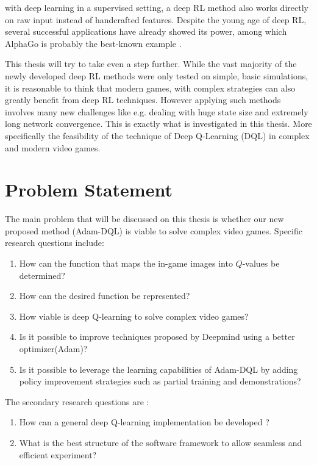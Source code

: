         with deep learning in a supervised setting, a deep RL method also works directly on raw input instead
        of handcrafted features. Despite the young age of deep RL, several successful applications have already
        showed its power\cite{mnih2015humanlevel}\cite{DBLP:journals/corr/LevineFDA15}, among which AlphaGo is probably the best-known example \cite{deepGO}.
        \par
        This thesis will try to take even a step  further. While the vast majority of the newly developed deep
        RL methods were only tested on simple, basic simulations, it is reasonable to think that modern games, with complex strategies can also greatly benefit from deep RL techniques. However applying such methods
        involves many new challenges like e.g. dealing with huge state size and extremely long network convergence. This is exactly what is investigated
        in this thesis. More specifically the feasibility of the technique of Deep Q-Learning (DQL) \cite{mnih2015humanlevel} in complex and modern video games.

	\section{Problem Statement}
	    The main problem that will be discussed on this thesis is whether our new proposed method (Adam-DQL) is viable to solve complex video games. Specific research questions include:
        \begin{enumerate}
            \item How can the function that maps the in-game images into $Q$-values be determined?
            \item How can the desired function be represented?
            \item How viable is deep Q-learning to solve complex video games?
            \item Is it possible to improve techniques proposed by Deepmind using a better optimizer(Adam)?
            \item Is it possible to leverage the learning capabilities of Adam-DQL by adding policy improvement strategies such as partial training and demonstrations? 
    \end{enumerate}
        The secondary research questions are :
        \begin{enumerate}
            \item How can a general deep Q-learning implementation be developed ?
            \item What is the best structure of the software framework to allow seamless and efficient experiment? 
        \end{enumerate}
	    
